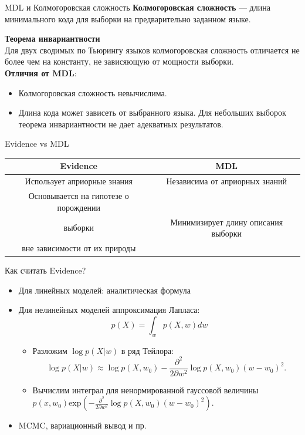 \documentclass[9pt,pdf,utf8,hyperref={unicode},aspectratio=169]{beamer}
\begin{document}
\begin{frame}{MDL и Колмогоровская сложность}
\textbf{Колмогоровская сложность} --- длина минимального кода для выборки на предварительно заданном языке.

\textbf{Теорема инвариантности}\\
Для двух сводимых по Тьюрингу языков колмогоровская сложность  отличается не более чем на константу, не зависяющую от мощности выборки.\\

\textbf{Отличия от MDL}:
\begin{itemize}
\item Колмогоровская сложность невычислима.
\item Длина кода может зависеть от выбранного языка. Для небольших выборок теорема инвариантности не дает адекватных результатов.
\end{itemize}
\end{frame}
\begin{frame}{Evidence vs MDL}
\centering
\begin{tabular}{ c | c  }
  \hline			
 \bf Evidence & \bf MDL \\
  \hline  
Использует априорные знания &  Независима от априорных знаний \\
  \hline  
Основывается на гипотезе о порождении\\ выборки & Минимизирует длину описания выборки\\ вне зависимости от их природы \\
  \hline  

\end{tabular}
\end{frame}


\begin{frame}{Как считать Evidence?}
\begin{itemize}
\item Для линейных моделей: аналитическая формула
\item Для нелинейных моделей аппроксимация Лапласа:
\[
	p(X) = \int_w p(X, w)dw
\]
\begin{itemize}
\item Разложим $\log p(X|w)$ в ряд Тейлора:
\[
	\log p(X|w) \approx  \log p(X,w_0) - \frac{\partial^2}{2\partial w^2} \log p(X,w_0) (w-w_0)^2. 
\]

\item Вычислим интеграл для ненормированной гауссовой величины $p(x,w_0)\text{exp}(  - \frac{\partial^2}{2\partial w^2} \log p(X,w_0) (w-w_0)^2).$

\end{itemize}

\item MCMC, вариационный вывод и пр.


\end{itemize}
\end{frame}
\end{document}
